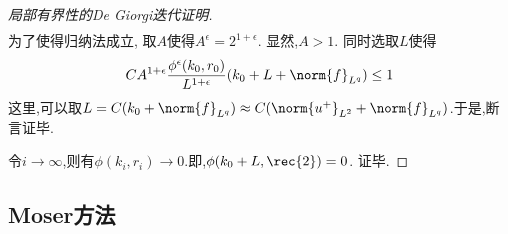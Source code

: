 \begin{proof}[局部有界性的De Giorgi迭代证明]
\begin{equation}
\begin{split}
        \end{split}
    \end{equation}
    为了使得归纳法成立, 取$A$使得$A^\epsilon=2^{1+\epsilon}$. 显然,$A>1$. 同时选取$L$使得
    \begin{equation}
        CA^{1+\epsilon}\frac{\phi^{\epsilon}(k_0,r_0)}{L^{1+\epsilon}}(k_0+L+\norm{f}_{L^q}) \le 1
    \end{equation}
    这里,可以取$L=C(k_0+\norm{f}_{L^q})\approx C(\norm{u^+}_{L^2}+\norm{f}_{L^q})$.于是,断言证毕.
    \par 令$i \to \infty$,则有$\phi(k_i,r_i) \to 0$.即,$\phi(k_0+L,\rec{2})=0$. 证毕.
\end{proof}
\subsection{Moser方法}

